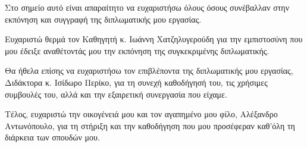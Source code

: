 \begin{acknowledgements}
Στο σημείο αυτό είναι απαραίτητο να ευχαριστήσω όλους όσους συνέβαλλαν 
στην εκπόνηση και συγγραφή της διπλωματικής μου εργασίας. 
\par Ευχαριστώ θερμά τον Καθηγητή κ. Ιωάννη Χατζηλυγερούδη για την εμπιστοσύνη που μου έδειξε 
αναθέτοντάς μου την εκπόνηση της συγκεκριμένης διπλωματικής. 
\par Θα ήθελα επίσης να ευχαριστήσω τον επιβλέποντα της διπλωματικής μου εργασίας, Διδάκτορα κ. Ισίδωρο Περίκο, 
για τη συνεχή καθοδήγησή του, τις χρήσιμες συμβουλές του, αλλά και την εξαιρετική
συνεργασία που είχαμε. 
\par Τέλος, ευχαριστώ την οικογένειά μου και τον αγαπημένο μου φίλο, Αλέξανδρο Αντωνόπουλο, 
για τη στήριξη και την καθοδήγηση που μου προσέφεραν καθ'όλη τη διάρκεια των σπουδών μου.
\end{acknowledgements}